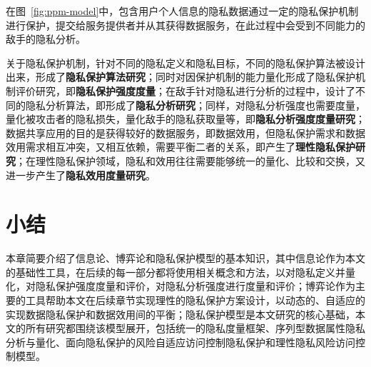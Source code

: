 在图~\ref{fig:ppm-model}中，包含用户个人信息的隐私数据通过一定的隐私保护机制进行保护，提交给服务提供者并从其获得数据服务，在此过程中会受到不同能力的敌手的隐私分析。

关于隐私保护机制，针对不同的隐私定义和隐私目标，不同的隐私保护算法被设计出来，形成了\textbf{隐私保护算法研究}；同时对因保护机制的能力量化形成了隐私保护机制评价研究，即\textbf{隐私保护强度度量}；在敌手针对隐私进行分析的过程中，设计了不同的隐私分析算法，即形成了\textbf{隐私分析研究}；同样，对隐私分析强度也需要度量，量化被攻击者的隐私损失，量化敌手的隐私获取量等，即\textbf{隐私分析强度度量研究}；数据共享应用的目的是获得较好的数据服务，即数据效用，但隐私保护需求和数据效用需求相互冲突，又相互依赖，需要平衡二者的关系，即产生了\textbf{理性隐私保护研究}；在理性隐私保护领域，隐私和效用往往需要能够统一的量化、比较和交换，又进一步产生了\textbf{隐私效用度量研究}。

\section{小结}

本章简要介绍了信息论、博弈论和隐私保护模型的基本知识，其中信息论作为本文的基础性工具，在后续的每一部分都将使用相关概念和方法，以对隐私定义并量化，对隐私保护强度度量和评价，对隐私分析强度进行度量和评价；博弈论作为主要的工具帮助本文在后续章节实现理性的隐私保护方案设计，以动态的、自适应的实现数据隐私保护和数据效用间的平衡；隐私保护模型是本文研究的核心基础，本文的所有研究都围绕该模型展开，包括统一的隐私度量框架、序列型数据属性隐私分析与量化、面向隐私保护的风险自适应访问控制隐私保护和理性隐私风险访问控制模型。